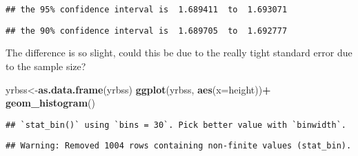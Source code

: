 \documentclass[
]{article}
\newenvironment{Shaded}{\begin{snugshade}}{\end{snugshade}}
\newcommand{\CommentTok}[1]{\textcolor[rgb]{0.56,0.35,0.01}{\textit{#1}}}
\newcommand{\DataTypeTok}[1]{\textcolor[rgb]{0.13,0.29,0.53}{#1}}
\newcommand{\DecValTok}[1]{\textcolor[rgb]{0.00,0.00,0.81}{#1}}
\newcommand{\KeywordTok}[1]{\textcolor[rgb]{0.13,0.29,0.53}{\textbf{#1}}}
\newcommand{\NormalTok}[1]{#1}
\newcommand{\OperatorTok}[1]{\textcolor[rgb]{0.81,0.36,0.00}{\textbf{#1}}}
\newcommand{\StringTok}[1]{\textcolor[rgb]{0.31,0.60,0.02}{#1}}
\begin{document}
\begin{verbatim}
## the 95% confidence interval is  1.689411  to  1.693071
\end{verbatim}

\begin{Shaded}
\end{Shaded}

\begin{verbatim}
## the 90% confidence interval is  1.689705  to  1.692777
\end{verbatim}

The difference is so slight, could this be due to the really tight
standard error due to the sample size?

\begin{Shaded}
\begin{Highlighting}[]
\NormalTok{yrbss<-}\KeywordTok{as.data.frame}\NormalTok{(yrbss)}
\KeywordTok{ggplot}\NormalTok{(yrbss, }\KeywordTok{aes}\NormalTok{(}\DataTypeTok{x=}\NormalTok{height))}\OperatorTok{+}
\StringTok{  }\KeywordTok{geom_histogram}\NormalTok{()}
\end{Highlighting}
\end{Shaded}

\begin{verbatim}
## `stat_bin()` using `bins = 30`. Pick better value with `binwidth`.
\end{verbatim}

\begin{verbatim}
## Warning: Removed 1004 rows containing non-finite values (stat_bin).
\end{verbatim}
\end{document}
